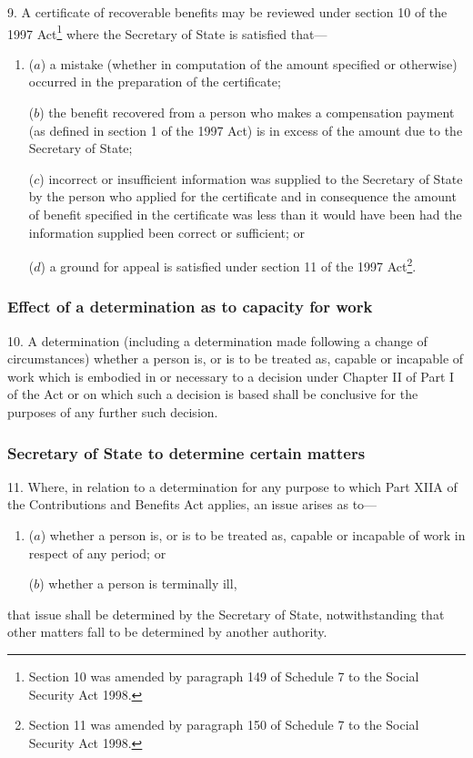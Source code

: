 \documentclass[12pt,a4paper]{article}
\begin{document}
9.  A certificate of recoverable benefits may be reviewed under section 10 of the 1997 Act\footnote{\frenchspacing Section 10 was amended by paragraph 149 of Schedule 7 to the Social Security Act 1998.} where the Secretary of State is satisfied that—
\begin{enumerate}\item[]
($a$) a mistake (whether in computation of the amount specified or otherwise) occurred in the preparation of the certificate;

($b$) the benefit recovered from a person who makes a compensation payment (as defined in section 1 of the 1997 Act) is in excess of the amount due to the Secretary of State;

($c$) incorrect or insufficient information was supplied to the Secretary of State by the person who applied for the certificate and in consequence the amount of benefit specified in the certificate was less than it would have been had the information supplied been correct or sufficient; or

($d$) a ground for appeal is satisfied under section 11 of the 1997 Act\footnote{\frenchspacing Section 11 was amended by paragraph 150 of Schedule 7 to the Social Security Act 1998.}.
\end{enumerate}

\subsubsection[10. Effect of a determination as to capacity for work]{Effect of a determination as to capacity for work}

10.  A determination (including a determination made following a change of circumstances) whether a person is, or is to be treated as, capable or incapable of work which is embodied in or necessary to a decision under Chapter II of Part I of the Act or on which such a decision is based shall be conclusive for the purposes of any further such decision.

\subsubsection[11. Secretary of State to determine certain matters]{Secretary of State to determine certain matters}

11.  Where, in relation to a determination for any purpose to which Part XIIA of the Contributions and Benefits Act applies, an issue arises as to—
\begin{enumerate}\item[]
($a$) whether a person is, or is to be treated as, capable or incapable of work in respect of any period; or

($b$) whether a person is terminally ill,
\end{enumerate}
that issue shall be determined by the Secretary of State, notwithstanding that other matters fall to be determined by another authority.
\end{document}

